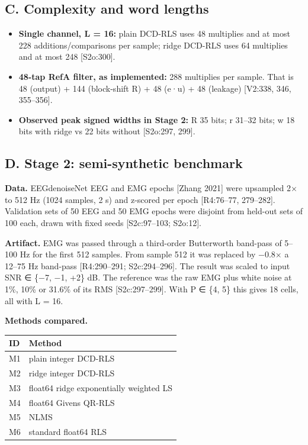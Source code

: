 \documentclass[
  9pt,
]{article}
\providecommand{\tightlist}{%
  \setlength{\itemsep}{0pt}\setlength{\parskip}{0pt}}
\begin{document}
\hypertarget{c.-complexity-and-word-lengths}{%
\subsection{C. Complexity and word
lengths}\label{c.-complexity-and-word-lengths}}

\begin{itemize}
\tightlist
\item
  \textbf{Single channel, L = 16:} plain DCD-RLS uses 48 multiplies and
  at most 228 additions/comparisons per sample; ridge DCD-RLS uses 64
  multiplies and at most 248 {[}S2o:300{]}.
\item
  \textbf{48-tap RefA filter, as implemented:} 288 multiplies per
  sample. That is 48 (output) + 144 (block-shift R) + 48 (e·u) + 48
  (leakage) {[}V2:338, 346, 355--356{]}.
\item
  \textbf{Observed peak signed widths in Stage 2:} R 35 bits; r 31--32
  bits; w 18 bits with ridge vs 22 bits without {[}S2o:297, 299{]}.
\end{itemize}

\hypertarget{d.-stage-2-semi-synthetic-benchmark}{%
\subsection{D. Stage 2: semi-synthetic
benchmark}\label{d.-stage-2-semi-synthetic-benchmark}}

\textbf{Data.} EEGdenoiseNet EEG and EMG epochs {[}Zhang 2021{]} were
upsampled 2× to 512 Hz (1024 samples, 2 s) and z-scored per epoch
{[}R4:76--77, 279--282{]}. Validation sets of 50 EEG and 50 EMG epochs
were disjoint from held-out sets of 100 each, drawn with fixed seeds
{[}S2c:97--103; S2o:12{]}.

\textbf{Artifact.} EMG was passed through a third-order Butterworth
band-pass of 5--100 Hz for the first 512 samples. From sample 512 it was
replaced by −0.8× a 12--75 Hz band-pass {[}R4:290--291; S2c:294--296{]}.
The result was scaled to input SNR ∈ \{−7, −1, +2\} dB. The reference
was the raw EMG plus white noise at 1\%, 10\% or 31.6\% of its RMS
{[}S2c:297--299{]}. With P ∈ \{4, 5\} this gives 18 cells, all with L =
16.

\textbf{Methods compared.}

\begin{longtable}[]{@{}ll@{}}
\toprule\noalign{}
ID & Method \\
\midrule\noalign{}
\endhead
\bottomrule\noalign{}
\endlastfoot
M1 & plain integer DCD-RLS \\
M2 & ridge integer DCD-RLS \\
M3 & float64 ridge exponentially weighted LS \\
M4 & float64 Givens QR-RLS \\
M5 & NLMS \\
M6 & standard float64 RLS \\
\end{longtable}
\end{document}
